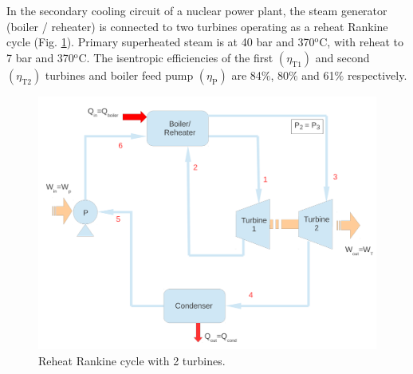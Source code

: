 \documentclass[calculator,steamtables]{exam}
\begin{document}
\begin{question} 
In the secondary cooling circuit of a nuclear power plant, the steam generator (boiler / reheater) is connected to two turbines operating as a reheat Rankine cycle (Fig. \ref{exam_mod01_rankinecycle}). Primary superheated steam is at 40 bar and 370$^{\text{o}}$C, with reheat to 7 bar and 370$^{\text{o}}$C. The isentropic efficiencies of the first $\left(\eta_{\text{T1}}\right)$ and second $\left(\eta_{\text{T2}}\right)$ turbines and boiler feed pump $\left(\eta_{\text{P}}\right)$ are 84$\%$, 80$\%$ and 61$\%$ respectively. 

\begin{figure}[h]
\begin{center}
\includegraphics[width=15.cm,clip]{./Pics/Exam_Reheat_Rankine_Cycle}
\caption{ Reheat Rankine cycle with 2 turbines.}
\label{exam_mod01_rankinecycle}
\end{center}
\end{figure}



\end{question}
\end{document}
